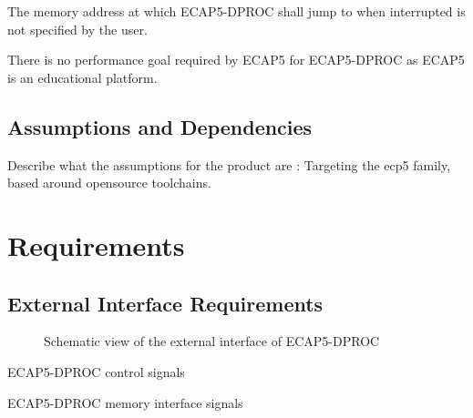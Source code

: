
\begin{content}
The memory address at which ECAP5-DPROC shall jump to when interrupted is not specified by the user.
\end{content}


\begin{content}
There is no performance goal required by ECAP5 for ECAP5-DPROC as ECAP5 is an educational platform.
\end{content}

\subsection{Assumptions and Dependencies}

\begin{content}
Describe what the assumptions for the product are : Targeting the ecp5 family, based around opensource toolchains.
\end{content}

\section{Requirements}

\subsection{External Interface Requirements}

\begin{figure}[h!]
    \centering
    
    \caption{Schematic view of the external interface of ECAP5-DPROC}
    \label{fig:externalinterface}
\end{figure}

\begin{table}[H]
  \centering
  
  \caption{ECAP5-DPROC control signals}
  \label{tab:control-interface}
\end{table}

\begin{table}[H]
  \centering
  
  \caption{ECAP5-DPROC memory interface signals}
  \label{tab:memory-interface}
\end{table}

